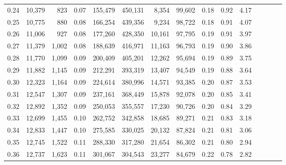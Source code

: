 \begin{tabular}{rrrcrrrrrrrrrrr}
0.24 &  10,379 &    823 &                                       0.07 &  155,479 &  450,131 &    8,354 &   99,602 &  0.18 &  0.92 &                         4.17 \\
0.25 &  10,775 &    880 &                                       0.08 &  166,254 &  439,356 &    9,234 &   98,722 &  0.18 &  0.91 &                         4.07 \\
0.26 &  11,006 &    927 &                                       0.08 &  177,260 &  428,350 &   10,161 &   97,795 &  0.19 &  0.91 &                         3.97 \\
0.27 &  11,379 &  1,002 &                                       0.08 &  188,639 &  416,971 &   11,163 &   96,793 &  0.19 &  0.90 &                         3.86 \\
0.28 &  11,770 &  1,099 &                                       0.09 &  200,409 &  405,201 &   12,262 &   95,694 &  0.19 &  0.89 &                         3.75 \\
0.29 &  11,882 &  1,145 &                                       0.09 &  212,291 &  393,319 &   13,407 &   94,549 &  0.19 &  0.88 &                         3.64 \\
0.30 &  12,323 &  1,164 &                                       0.09 &  224,614 &  380,996 &   14,571 &   93,385 &  0.20 &  0.87 &                         3.53 \\
0.31 &  12,547 &  1,307 &                                       0.09 &  237,161 &  368,449 &   15,878 &   92,078 &  0.20 &  0.85 &                         3.41 \\
0.32 &  12,892 &  1,352 &                                       0.09 &  250,053 &  355,557 &   17,230 &   90,726 &  0.20 &  0.84 &                         3.29 \\
0.33 &  12,699 &  1,455 &                                       0.10 &  262,752 &  342,858 &   18,685 &   89,271 &  0.21 &  0.83 &                         3.18 \\
0.34 &  12,833 &  1,447 &                                       0.10 &  275,585 &  330,025 &   20,132 &   87,824 &  0.21 &  0.81 &                         3.06 \\
0.35 &  12,745 &  1,522 &                                       0.11 &  288,330 &  317,280 &   21,654 &   86,302 &  0.21 &  0.80 &                         2.94 \\
0.36 &  12,737 &  1,623 &                                       0.11 &  301,067 &  304,543 &   23,277 &   84,679 &  0.22 &  0.78 &                         2.82 \\

\end{tabular}
